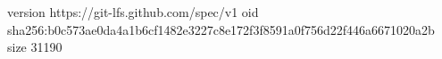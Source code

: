 version https://git-lfs.github.com/spec/v1
oid sha256:b0c573ae0da4a1b6cf1482e3227c8e172f3f8591a0f756d22f446a6671020a2b
size 31190
